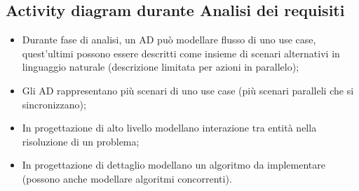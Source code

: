\documentclass{article}
\begin{document}
    \subsection{Activity diagram durante Analisi dei requisiti}
      \begin{itemize}
        \item Durante fase di analisi, un AD può modellare flusso di uno use case, quest'ultimi possono essere descritti come insieme di scenari alternativi in linguaggio naturale (descrizione limitata per azioni in parallelo);
        \item  Gli AD rappresentano più scenari di uno use case (più scenari paralleli che si sincronizzano); 
        \item In progettazione di alto livello modellano interazione tra entità nella risoluzione di un problema;
        \item In progettazione di dettaglio modellano un algoritmo da implementare (possono anche modellare algoritmi concorrenti).
      \end{itemize}
\end{document}

